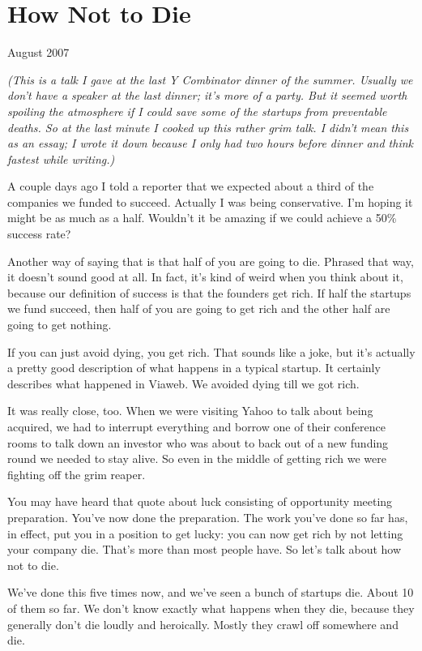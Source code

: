 \chapter{How Not to Die}

August 2007

\emph{(This is a talk I gave at the last Y Combinator dinner of the
summer. Usually we don't have a speaker at the last dinner; it's more of
a party. But it seemed worth spoiling the atmosphere if I could save
some of the startups from preventable deaths. So at the last minute I
cooked up this rather grim talk. I didn't mean this as an essay; I wrote
it down because I only had two hours before dinner and think fastest
while writing.)}

A couple days ago I told a reporter that we expected about a third of
the companies we funded to succeed. Actually I was being conservative.
I'm hoping it might be as much as a half. Wouldn't it be amazing if we
could achieve a 50\% success rate?

Another way of saying that is that half of you are going to die. Phrased
that way, it doesn't sound good at all. In fact, it's kind of weird when
you think about it, because our definition of success is that the
founders get rich. If half the startups we fund succeed, then half of
you are going to get rich and the other half are going to get nothing.

If you can just avoid dying, you get rich. That sounds like a joke, but
it's actually a pretty good description of what happens in a typical
startup. It certainly describes what happened in Viaweb. We avoided
dying till we got rich.

It was really close, too. When we were visiting Yahoo to talk about
being acquired, we had to interrupt everything and borrow one of their
conference rooms to talk down an investor who was about to back out of a
new funding round we needed to stay alive. So even in the middle of
getting rich we were fighting off the grim reaper.

You may have heard that quote about luck consisting of opportunity
meeting preparation. You've now done the preparation. The work you've
done so far has, in effect, put you in a position to get lucky: you can
now get rich by not letting your company die. That's more than most
people have. So let's talk about how not to die.

We've done this five times now, and we've seen a bunch of startups die.
About 10 of them so far. We don't know exactly what happens when they
die, because they generally don't die loudly and heroically. Mostly they
crawl off somewhere and die.

